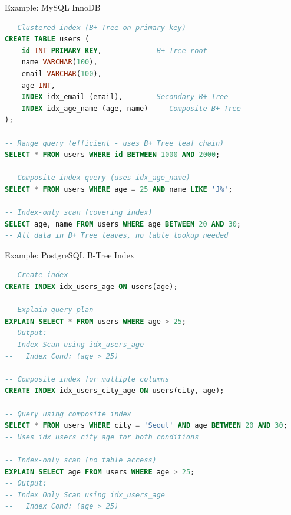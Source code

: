 \documentclass[aspectratio=169]{beamer}
\begin{document}
\begin{frame}[fragile]{Example: MySQL InnoDB}
\begin{lstlisting}[language=SQL, basicstyle=\ttfamily\tiny]
-- Clustered index (B+ Tree on primary key)
CREATE TABLE users (
    id INT PRIMARY KEY,          -- B+ Tree root
    name VARCHAR(100),
    email VARCHAR(100),
    age INT,
    INDEX idx_email (email),     -- Secondary B+ Tree
    INDEX idx_age_name (age, name)  -- Composite B+ Tree
);

-- Range query (efficient - uses B+ Tree leaf chain)
SELECT * FROM users WHERE id BETWEEN 1000 AND 2000;

-- Composite index query (uses idx_age_name)
SELECT * FROM users WHERE age = 25 AND name LIKE 'J%';

-- Index-only scan (covering index)
SELECT age, name FROM users WHERE age BETWEEN 20 AND 30;
-- All data in B+ Tree leaves, no table lookup needed
\end{lstlisting}
\end{frame}

\begin{frame}[fragile]{Example: PostgreSQL B-Tree Index}
\begin{lstlisting}[language=SQL, basicstyle=\ttfamily\tiny]
-- Create index
CREATE INDEX idx_users_age ON users(age);

-- Explain query plan
EXPLAIN SELECT * FROM users WHERE age > 25;
-- Output:
-- Index Scan using idx_users_age
--   Index Cond: (age > 25)

-- Composite index for multiple columns
CREATE INDEX idx_users_city_age ON users(city, age);

-- Query using composite index
SELECT * FROM users WHERE city = 'Seoul' AND age BETWEEN 20 AND 30;
-- Uses idx_users_city_age for both conditions

-- Index-only scan (no table access)
EXPLAIN SELECT age FROM users WHERE age > 25;
-- Output:
-- Index Only Scan using idx_users_age
--   Index Cond: (age > 25)
\end{lstlisting}
\end{frame}
\end{document}
